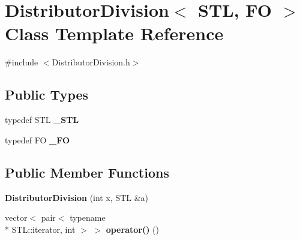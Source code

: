 \hypertarget{class_distributor_division}{\section{Distributor\-Division$<$ S\-T\-L, F\-O $>$ Class Template Reference}
\label{class_distributor_division}
}


{\ttfamily \#include $<$Distributor\-Division.\-h$>$}

\subsection*{Public Types}
\begin{DoxyCompactItemize}
\item 
\hypertarget{class_distributor_division_ae97a4cdf404cf245e757bb47bda3ee3e}{typedef S\-T\-L {\bfseries \-\_\-\-S\-T\-L}}\label{class_distributor_division_ae97a4cdf404cf245e757bb47bda3ee3e}

\item 
\hypertarget{class_distributor_division_a9c9edc89218167c39a3aa0e797ad22c5}{typedef F\-O {\bfseries \-\_\-\-F\-O}}\label{class_distributor_division_a9c9edc89218167c39a3aa0e797ad22c5}

\end{DoxyCompactItemize}
\subsection*{Public Member Functions}
\begin{DoxyCompactItemize}
\item 
\hypertarget{class_distributor_division_a326603e72a0c3a5df36c1ddd5a5434d2}{{\bfseries Distributor\-Division} (int x, S\-T\-L \&a)}\label{class_distributor_division_a326603e72a0c3a5df36c1ddd5a5434d2}

\item 
\hypertarget{class_distributor_division_ab3b16a94bd01c77e3697e82a293a787f}{vector$<$ pair$<$ typename \\*
S\-T\-L\-::iterator, int $>$ $>$ {\bfseries operator()} ()}\label{class_distributor_division_ab3b16a94bd01c77e3697e82a293a787f}

\end{DoxyCompactItemize}
